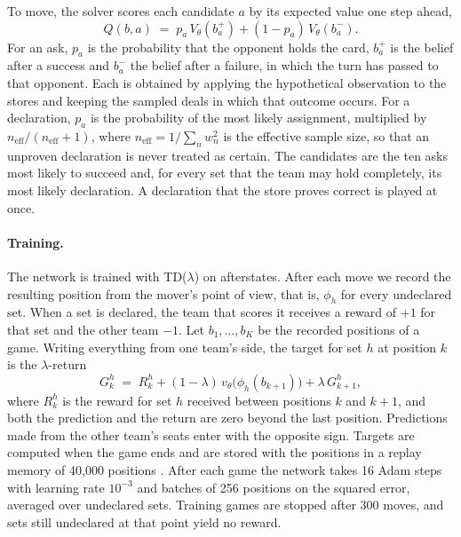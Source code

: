 \documentclass{article}
\begin{document}
To move, the solver scores each candidate $a$ by its expected value one step
ahead,
\begin{equation}
  Q(b,a) \;=\; p_a\,V_\theta(b_a^{+}) + (1-p_a)\,V_\theta(b_a^{-}) .
  \label{eq:lookahead}
\end{equation}
For an ask, $p_a$ is the probability that the opponent holds the card,
$b_a^{+}$ is the belief after a success and $b_a^{-}$ the belief after a
failure, in which the turn has passed to that opponent.  Each is obtained by
applying the hypothetical observation to the stores and keeping the sampled
deals in which that outcome occurs.  For a declaration, $p_a$ is the
probability of the most likely assignment, multiplied by
$n_{\mathrm{eff}}/(n_{\mathrm{eff}}+1)$, where
$n_{\mathrm{eff}} = 1/\sum_n w_n^2$ is the effective sample size, so that an
unproven declaration is never treated as certain.  The candidates are the ten
asks most likely to succeed and, for every set that the team may hold
completely, its most likely declaration.  A declaration that the store proves
correct is played at once.

\paragraph{Training.}
The network is trained with TD($\lambda$) on afterstates.  After each move we
record the resulting position from the mover's point of view, that is,
$\phi_h$ for every undeclared set.  When a set is declared, the team that
scores it receives a reward of $+1$ for that set and the other team $-1$.  Let
$b_1, \dots, b_K$ be the recorded positions of a game.  Writing everything from
one team's side, the target for set $h$ at position $k$ is the
$\lambda$-return
\begin{equation}
  G^h_k \;=\; R^h_k + (1-\lambda)\,v_\theta\bigl(\phi_h(b_{k+1})\bigr) + \lambda\,G^h_{k+1} ,
  \label{eq:target}
\end{equation}
where $R^h_k$ is the reward for set $h$ received between positions $k$ and
$k+1$, and both the prediction and the return are zero beyond the last
position.  Predictions made from the other team's seats enter with the opposite
sign.  Targets are computed when the game ends and are stored with the
positions in a replay memory of 40,000 positions \citep{lin1992}.  After each
game the network takes 16 Adam steps \citep{kingma2015} with learning rate
$10^{-3}$ and batches of 256 positions on the squared error, averaged over
undeclared sets.  Training games are stopped after 300 moves, and sets still
undeclared at that point yield no reward.
\end{document}
